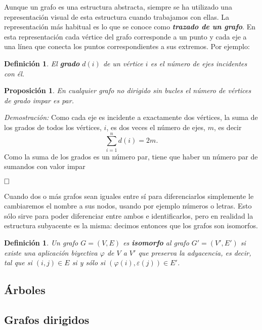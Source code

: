 \documentclass[12pt]{article}
\newtheorem{proposition}[theorem]{Proposición}
\newtheorem{definition}[theorem]{Definición}
\begin{document}
Aunque un grafo es una estructura abstracta, siempre se ha utilizado una representación visual de esta estructura cuando trabajamos con ellas. La representación más habitual es lo que se conoce como \textbf{\textit{trazado de un grafo}}. En esta representación cada vértice del grafo corresponde a un punto y cada eje a una línea que conecta los puntos correspondientes a sus extremos. Por ejemplo:



\begin{definition}El \textbf{grado} $d(i)$ de un vértice $i$ es el número de ejes incidentes con él.
\end{definition} 

\begin{proposition}En cualquier grafo no dirigido sin bucles el número de vértices de grado impar es par.
\end{proposition}
\emph{Demostración: }Como cada eje es incidente a exactamente dos vértices, la suma de los grados de todos los vértices, $i$, es dos veces el número de ejes, $m$,  es decir $$\sum^n_{i=1}d(i) = 2m.$$ Como la suma de los grados es un número par, tiene que haber un número par de sumandos con valor impar

$\hfill \square$

Cuando dos o más grafos sean iguales entre sí para diferenciarlos simplemente le cambiaremos el nombre a sus nodos, usando por ejemplo números o letras. Esto sólo sirve para poder diferenciar entre ambos e identificarlos, pero en realidad la estructura subyacente es la misma: decimos entonces que los grafos son isomorfos.

\begin{definition}Un grafo $G = (V,E)$ es \textbf{isomorfo} al grafo $G' = (V', E')$ si existe una aplicación biyectiva $\varphi$ de $V$ a $V'$ que preserva la adyacencia, es decir, tal que si $(i,j) \in E$ si y sólo si $(\varphi(i), \varepsilon(j) )  \in E'$.
\end{definition}


\subsection{Árboles}
\subsection{Grafos dirigidos}
\end{document}
